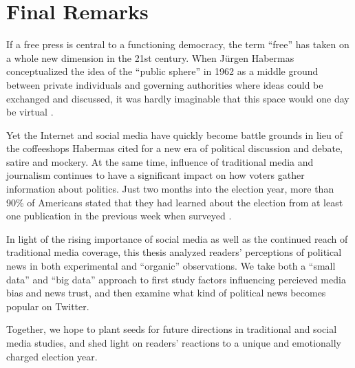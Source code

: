 \chapter{Final Remarks}
If a free press is central to a functioning democracy, the term ``free'' has taken on a whole new dimension in the 21st century. When Jürgen Habermas conceptualized the idea of the ``public sphere'' in 1962 as a middle ground between private individuals and governing authorities where ideas could be exchanged and discussed, it was hardly imaginable that this space would one day be virtual \cite{habermas1991structural}.

Yet the Internet and social media have quickly become battle grounds in lieu of the coffeeshops Habermas cited for a new era of political discussion and debate, satire and mockery. At the same time, influence of traditional media and journalism continues to have a significant impact on how voters gather information about politics. Just two months into the election year, more than 90\% of Americans stated that they had learned about the election from at least one publication in the previous week when surveyed \cite{election-fatigue}. 

In light of the rising importance of social media as well as the continued reach of traditional media coverage, this thesis analyzed readers' perceptions of political news in both experimental and ``organic'' observations. We take both  a ``small data'' and ``big data'' approach to first study factors influencing percieved media bias and news trust, and then examine what kind of political news becomes popular on Twitter. 

Together, we hope to plant seeds for future directions in traditional and social media studies, and shed light on readers' reactions to a unique and emotionally charged election year.